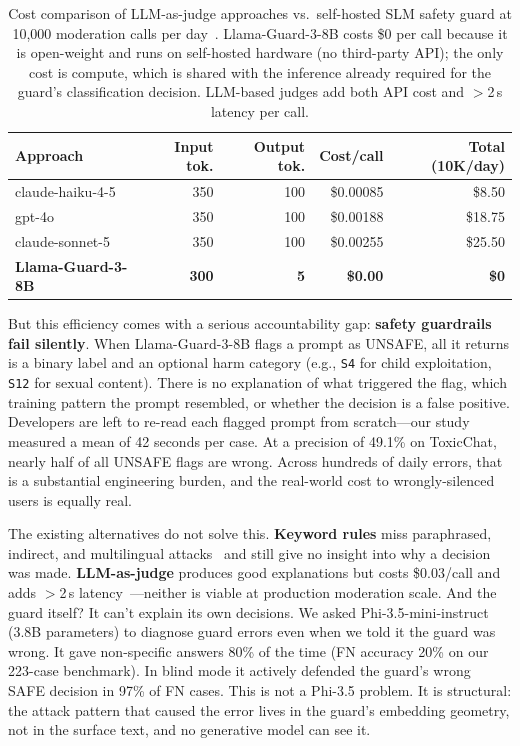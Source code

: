 \documentclass[letterpaper]{article}
\begin{document}
\begin{table}[h]
\centering
\small
\caption{Cost comparison of LLM-as-judge approaches vs.\ self-hosted SLM safety guard
at 10,000 moderation calls per day~\cite{anthropic2025pricing,openai2025pricing,inan2023llamaguard}.
Llama-Guard-3-8B costs \$0 per call because it is open-weight and runs on self-hosted
hardware (no third-party API); the only cost is compute, which is shared with the
inference already required for the guard's classification decision.
LLM-based judges add both API cost and $>$2\,s latency per call.}
\label{tab:cost}
\begin{tabular}{lrrrr}
\toprule
\textbf{Approach} & \textbf{Input tok.} & \textbf{Output tok.} & \textbf{Cost/call} & \textbf{Total (10K/day)} \\
\midrule
claude-haiku-4-5   & 350 & 100 & \$0.00085 & \$8.50 \\
gpt-4o             & 350 & 100 & \$0.00188 & \$18.75 \\
claude-sonnet-5    & 350 & 100 & \$0.00255 & \$25.50 \\
\textbf{Llama-Guard-3-8B} & \textbf{300} & \textbf{5} & \textbf{\$0.00} & \textbf{\$0} \\
\bottomrule
\end{tabular}
\end{table}

But this efficiency comes with a serious accountability gap: \textbf{safety guardrails fail silently}.
When Llama-Guard-3-8B flags a prompt as UNSAFE, all it returns is a binary label and an
optional harm category (e.g., \texttt{S4} for child exploitation, \texttt{S12} for sexual content).
There is no explanation of what triggered the flag, which training pattern the prompt resembled,
or whether the decision is a false positive. Developers are left to re-read each flagged prompt
from scratch---our study measured a mean of 42 seconds per case. At a precision of 49.1\%
on ToxicChat, nearly half of all UNSAFE flags are wrong. Across hundreds of daily errors,
that is a substantial engineering burden, and the real-world cost to wrongly-silenced users
is equally real.

The existing alternatives do not solve this. \textbf{Keyword rules} miss paraphrased,
indirect, and multilingual attacks~\cite{gehman2020realtoxicity} and still give no
insight into why a decision was made. \textbf{LLM-as-judge} produces good explanations but
costs \$0.03/call and adds $>$2\,s latency~\cite{dasantar2025aies}---neither is viable at
production moderation scale. And the guard itself? It can't explain its own decisions.
We asked Phi-3.5-mini-instruct (3.8B parameters) to diagnose guard errors even when we
told it the guard was wrong. It gave non-specific answers 80\% of the time (FN accuracy 20\%
on our 223-case benchmark). In blind mode it actively defended the guard's wrong SAFE decision
in 97\% of FN cases. This is not a Phi-3.5 problem. It is structural: the attack pattern
that caused the error lives in the guard's embedding geometry, not in the surface text,
and no generative model can see it.
\end{document}
